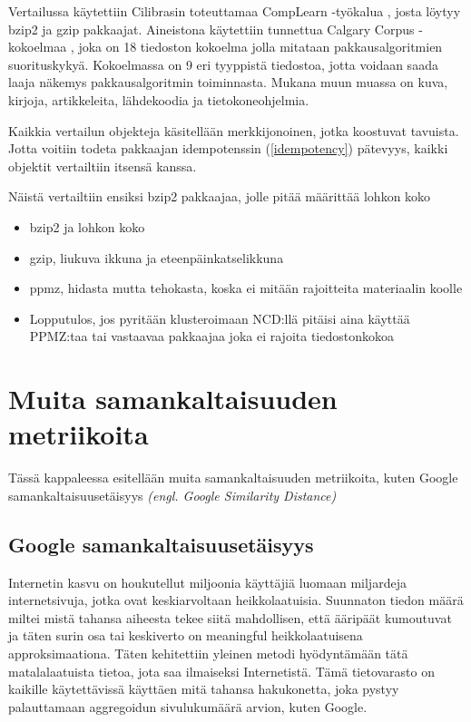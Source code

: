 \documentclass[12pt,finnish,draft]{tktltiki2}
\theoremstyle{definition}
\theoremstyle{remark}
\newcommand{\engl}[1]{\emph{(engl. #1)}}
\begin{document}
      Vertailussa käytettiin Cilibrasin toteuttamaa CompLearn -työkalua \cite{complearn}, josta löytyy bzip2 ja gzip pakkaajat. Aineistona käytettiin tunnettua Calgary Corpus -kokoelmaa \cite{calgarycorpus}, joka on 18 tiedoston kokoelma jolla mitataan pakkausalgoritmien suorituskykyä. Kokoelmassa on 9 eri tyyppistä tiedostoa, jotta voidaan saada laaja näkemys pakkausalgoritmin toiminnasta. Mukana muun muassa on kuva, kirjoja, artikkeleita, lähdekoodia ja tietokoneohjelmia.

      Kaikkia vertailun objekteja käsitellään merkkijonoinen, jotka koostuvat tavuista. Jotta voitiin todeta pakkaajan idempotenssin (\ref{idempotency}) pätevyys, kaikki objektit vertailtiin itsensä kanssa.

      Näistä vertailtiin ensiksi bzip2 pakkaajaa, jolle pitää määrittää lohkon koko

    \begin{itemize}
      \item bzip2 ja lohkon koko
      \item gzip, liukuva ikkuna ja eteenpäinkatselikkuna
      \item ppmz, hidasta mutta tehokasta, koska ei mitään rajoitteita materiaalin koolle
      \item Lopputulos, jos pyritään klusteroimaan NCD:llä pitäisi aina käyttää PPMZ:taa tai vastaavaa pakkaajaa joka ei rajoita tiedostonkokoa
    \end{itemize}




\section{Muita samankaltaisuuden metriikoita} %
\label{sec:muita_samankaltaisuuden_metriikoita}
  Tässä kappaleessa esitellään muita samankaltaisuuden metriikoita, kuten Google samankaltaisuusetäisyys \engl{Google Similarity Distance}
  \subsection{Google samankaltaisuusetäisyys} %
  \label{sub:google_similarity_distance}


    Internetin kasvu on houkutellut miljoonia käyttäjiä luomaan miljardeja internetsivuja, jotka ovat keskiarvoltaan heikkolaatuisia. Suunnaton tiedon määrä miltei mistä tahansa aiheesta tekee siitä mahdollisen, että ääripäät kumoutuvat ja täten surin osa tai keskiverto on meaningful heikkolaatuisena approksimaationa. Täten kehitettiin yleinen metodi hyödyntämään tätä matalalaatuista tietoa, jota saa ilmaiseksi Internetistä. Tämä tietovarasto on kaikille käytettävissä käyttäen mitä tahansa hakukonetta, joka pystyy palauttamaan aggregoidun sivulukumäärä arvion, kuten Google.
\end{document}
